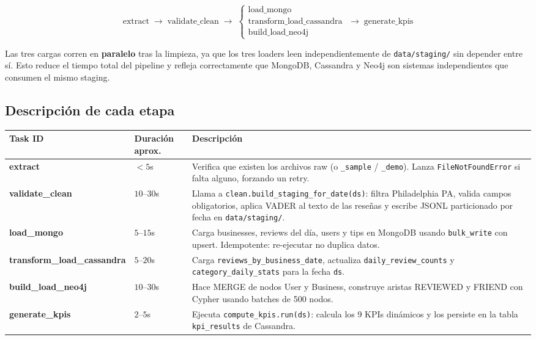 \documentclass[12pt,a4paper]{article}
\begin{document}
\[
\text{extract} \;\to\; \text{validate\_clean} \;\to\;
\begin{cases} \text{load\_mongo} \\ \text{transform\_load\_cassandra} \\ \text{build\_load\_neo4j} \end{cases}
\;\to\; \text{generate\_kpis}
\]

Las tres cargas corren en \textbf{paralelo} tras la limpieza, ya que los tres loaders
leen independientemente de \texttt{data/staging/} sin depender entre sí.
Esto reduce el tiempo total del pipeline y refleja correctamente que MongoDB, Cassandra
y Neo4j son sistemas independientes que consumen el mismo staging.

\subsection{Descripción de cada etapa}

\begin{longtable}{>{\bfseries\ttfamily\small}p{5cm} p{2.5cm} p{6.5cm}}
\toprule
\normalfont\textbf{Task ID} & \textbf{Duración aprox.} & \textbf{Descripción} \\
\midrule

extract &
$< 5$s &
Verifica que existen los archivos raw (o \texttt{\_sample} / \texttt{\_demo}). Lanza \texttt{FileNotFoundError} si falta alguno, forzando un retry. \\[0.3em]

validate\_clean &
$10$–$30$s &
Llama a \texttt{clean.build\_staging\_for\_date(ds)}: filtra Philadelphia PA, valida campos obligatorios, aplica VADER al texto de las reseñas y escribe JSONL particionado por fecha en \texttt{data/staging/}. \\[0.3em]

load\_mongo &
$5$–$15$s &
Carga businesses, reviews del día, users y tips en MongoDB usando \texttt{bulk\_write} con upsert. Idempotente: re-ejecutar no duplica datos. \\[0.3em]

transform\_load\_cassandra &
$5$–$20$s &
Carga \texttt{reviews\_by\_business\_date}, actualiza \texttt{daily\_review\_counts} y \texttt{category\_daily\_stats} para la fecha \texttt{ds}. \\[0.3em]

build\_load\_neo4j &
$10$–$30$s &
Hace MERGE de nodos User y Business, construye aristas REVIEWED y FRIEND con Cypher usando batches de 500 nodos. \\[0.3em]

generate\_kpis &
$2$–$5$s &
Ejecuta \texttt{compute\_kpis.run(ds)}: calcula los 9 KPIs dinámicos y los persiste en la tabla \texttt{kpi\_results} de Cassandra. \\
\bottomrule
\end{longtable}
\end{document}
